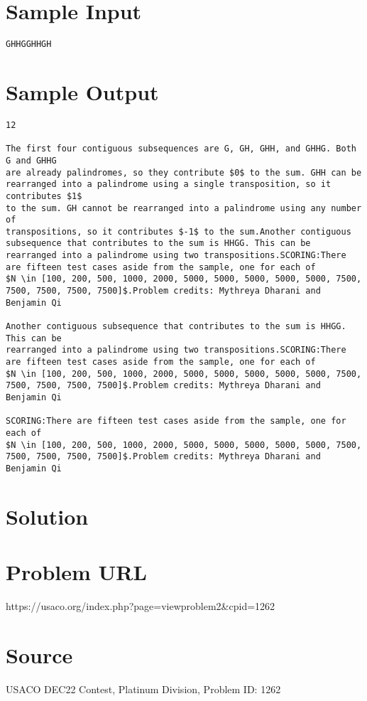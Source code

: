 \documentclass[12pt]{article}
\begin{document}
\section*{Sample Input}
\begin{verbatim}
GHHGGHHGH
\end{verbatim}

\section*{Sample Output}
\begin{verbatim}
12

The first four contiguous subsequences are G, GH, GHH, and GHHG. Both G and GHHG
are already palindromes, so they contribute $0$ to the sum. GHH can be
rearranged into a palindrome using a single transposition, so it contributes $1$
to the sum. GH cannot be rearranged into a palindrome using any number of 
transpositions, so it contributes $-1$ to the sum.Another contiguous subsequence that contributes to the sum is HHGG. This can be
rearranged into a palindrome using two transpositions.SCORING:There are fifteen test cases aside from the sample, one for each of 
$N \in [100, 200, 500, 1000, 2000, 5000, 5000, 5000, 5000, 5000, 7500, 7500, 7500, 7500, 7500]$.Problem credits: Mythreya Dharani and Benjamin Qi

Another contiguous subsequence that contributes to the sum is HHGG. This can be
rearranged into a palindrome using two transpositions.SCORING:There are fifteen test cases aside from the sample, one for each of 
$N \in [100, 200, 500, 1000, 2000, 5000, 5000, 5000, 5000, 5000, 7500, 7500, 7500, 7500, 7500]$.Problem credits: Mythreya Dharani and Benjamin Qi

SCORING:There are fifteen test cases aside from the sample, one for each of 
$N \in [100, 200, 500, 1000, 2000, 5000, 5000, 5000, 5000, 5000, 7500, 7500, 7500, 7500, 7500]$.Problem credits: Mythreya Dharani and Benjamin Qi
\end{verbatim}

\section*{Solution}


\section*{Problem URL}
https://usaco.org/index.php?page=viewproblem2&cpid=1262

\section*{Source}
USACO DEC22 Contest, Platinum Division, Problem ID: 1262
\end{document}
